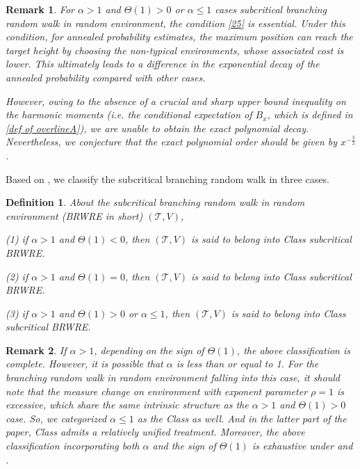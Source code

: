 \documentclass[]{article}
\numberwithin{equation}{section}
\theoremstyle{thmstyleone}%
\theoremstyle{thmstyletwo}%
\newtheorem{remark}{Remark}%
\theoremstyle{thmstylethree}%
\newtheorem{definition}{Definition}%
\theoremstyle{thmstylefour}%
\theoremstyle{thmstylefive}%
\theoremstyle{thmstylesix}%
\begin{document}
	\begin{remark}
		For $\alpha>1$ and $\varTheta(1)>0$ or $\alpha\leqslant 1$  cases subcritical branching random walk in random environment, the condition \cref{25} is essential. Under this condition, for annealed probability estimates, the maximum position can reach the target height by choosing the non-typical environments, whose associated cost is lower. This ultimately leads to a difference in the exponential decay of the annealed probability compared with other cases.
		
		However, owing to the absence of a crucial and sharp upper bound inequality on the harmonic moments (i.e. the conditional expectation of $B_x$, which is defined in \cref{def of overlineA}), we are unable to obtain the exact polynomial decay. Nevertheless, we conjecture that the exact polynomial order should be given by $x^{-\frac{3}{2}}$.
	\end{remark}
	
	
	Based on , we classify the subcritical branching random walk in three cases.
	\begin{definition}\label{Def of classfy}
		About the subcritical branching random walk in random environment (BRWRE in short) $(\mathcal{T},V)$,
		
		(1) if $\alpha>1$ and $\varTheta(1)<0$, then $(\mathcal{T},V)$ is said to belong into Class  subcritical BRWRE.
		
		(2) if $\alpha>1$ and $\varTheta(1)=0$, then $(\mathcal{T},V)$ is said to belong into Class  subcritical BRWRE.
		
		(3) if $\alpha>1$ and $\varTheta(1)>0$ or $\alpha\leqslant1$, then $(\mathcal{T},V)$ is said to belong into Class  subcritical BRWRE.
	\end{definition}
	
	\begin{remark}
		If $\alpha>1$, depending on the sign of $\varTheta(1)$, the above classification is complete.
		However, it is possible that $\alpha$ is less than or equal to 1. 
		For the branching random walk in random environment falling into this case, it should note that the measure change on environment with exponent parameter $\rho=1$ is excessive, which share the same intrinsic structure as the $\alpha>1$ and $\varTheta(1)>0$ case.
		So, we categorized $\alpha\leqslant 1$ as the Class  as well. And in the latter part of the paper, Class  admits a relatively unified treatment.
		Moreover, the above classification incorporating both $ \alpha$ and the sign of $\varTheta(1)$ is exhaustive under  and .
	\end{remark}
	
\end{document}
